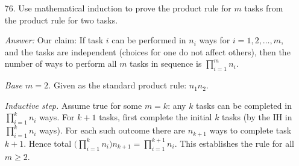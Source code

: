 \documentclass[11pt]{article}
\begin{document}
\begin{itemize}
    \item[76.] Use mathematical induction to prove the product rule for $m$ tasks from the product rule for two tasks.

    \medskip\textit{Answer:}
    Our claim: If task $i$ can be performed in $n_i$ ways for $i=1,2,\dots,m$, and the tasks are independent (choices for one do not affect others), then the number of ways to perform all $m$ tasks in sequence is $\prod_{i=1}^m n_i$.

    \emph{Base $m=2$.} Given as the standard product rule: $n_1 n_2$.

    \emph{Inductive step.} Assume true for some $m=k$: any $k$ tasks can be completed in $\prod_{i=1}^k n_i$ ways. For $k+1$ tasks, first complete the initial $k$ tasks (by the IH in $\prod_{i=1}^k n_i$ ways). For each such outcome there are $n_{k+1}$ ways to complete task $k+1$. Hence total $\big(\prod_{i=1}^k n_i\big) n_{k+1} = \prod_{i=1}^{k+1} n_i$. This establishes the rule for all $m\ge2$.
\end{itemize}
\end{document}
